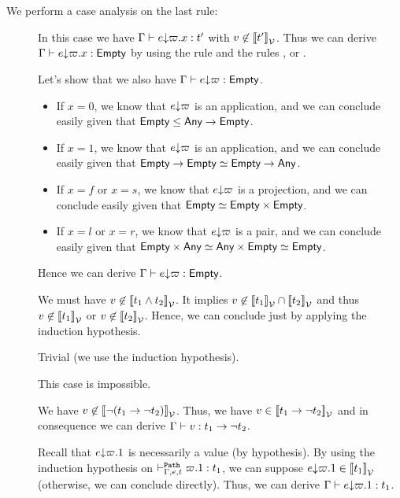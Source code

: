 \documentclass[a4paper]{article}
\theoremstyle{definition}
\begin{document}
        We perform a case analysis on the last rule:
        \begin{description}
          \item[] In this case we have $\Gamma \vdash e{\downarrow}\varpi.x : t'$ with $v \not\in {\llbracket t' \rrbracket}_{\mathcal{V}}$.
          Thus we can derive $\Gamma \vdash e{\downarrow}\varpi.x : \textsf{Empty}$ by using the rule  and the rules ,  or .

          Let's show that we also have $\Gamma \vdash e{\downarrow}\varpi : \textsf{Empty}$.
          \begin{itemize}
            \item If $x=0$, we know that $e{\downarrow}\varpi$ is an application, and we can conclude easily given that $\textsf{Empty} \leq \textsf{Any}\to \textsf{Empty}$.
            \item If $x=1$, we know that $e{\downarrow}\varpi$ is an application, and we can conclude easily given that $\textsf{Empty}\to \textsf{Empty} \simeq \textsf{Empty}\to \textsf{Any}$.
            \item If $x=f$ or $x=s$, we know that $e{\downarrow}\varpi$ is a projection, and we can conclude easily given that $\textsf{Empty} \simeq \textsf{Empty}\times \textsf{Empty}$.
            \item If $x=l$ or $x=r$, we know that $e{\downarrow}\varpi$ is a pair, and we can conclude easily given that $\textsf{Empty}\times \textsf{Any} \simeq \textsf{Any}\times \textsf{Empty} \simeq \textsf{Empty}$.
          \end{itemize}
          Hence we can derive $\Gamma \vdash e{\downarrow}\varpi : \textsf{Empty}$.

          \item[] We must have $v \not\in {\llbracket t_1 \land t_2 \rrbracket}_{\mathcal{V}}$. It implies $v \not\in {\llbracket t_1 \rrbracket}_{\mathcal{V}} \cap {\llbracket t_2 \rrbracket}_{\mathcal{V}}$
          and thus $v \not\in {\llbracket t_1 \rrbracket}_{\mathcal{V}}$ or $v \not\in {\llbracket t_2 \rrbracket}_{\mathcal{V}}$. Hence, we can conclude just by applying the induction hypothesis.
          \item[] Trivial (we use the induction hypothesis).
          \item[] This case is impossible.
          \item[] We have $v \not\in {\llbracket \neg (t_1\to \neg t_2) \rrbracket}_{\mathcal{V}}$. Thus, we have $v \in {\llbracket t_1\to \neg t_2 \rrbracket}_{\mathcal{V}}$
          and in consequence we can derive $\Gamma \vdash v:t_1\to \neg t_2$.

          Recall that $e{\downarrow}\varpi.1$ is necessarily a value (by hypothesis).
          By using the induction hypothesis on $\vdash^{\texttt{Path}}_{\Gamma,e,t} \varpi.1:t_1$, we can suppose $e{\downarrow}\varpi.1 \in {\llbracket t_1 \rrbracket}_{\mathcal{V}}$ (otherwise, we can conclude directly).
          Thus, we can derive $\Gamma \vdash e{\downarrow}\varpi.1: t_1$.


\end{description}
\end{document}
